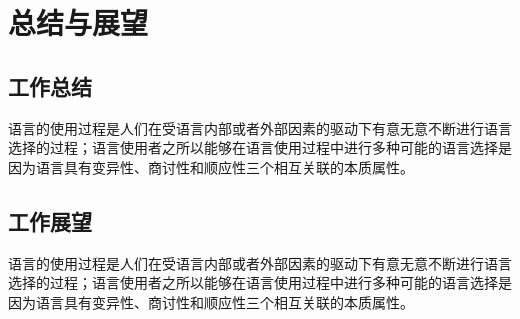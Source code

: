 \documentclass{standalone}
\begin{document}
\chapter{总结与展望}
\label{chap6}
\section{工作总结}

语言的使用过程是人们在受语言内部或者外部因素的驱动下有意无意不断进行语言选择的过程；语言使用者之所以能够在语言使用过程中进行多种可能的语言选择是因为语言具有变异性、商讨性和顺应性三个相互关联的本质属性。


\section{工作展望}

语言的使用过程是人们在受语言内部或者外部因素的驱动下有意无意不断进行语言选择的过程；语言使用者之所以能够在语言使用过程中进行多种可能的语言选择是因为语言具有变异性、商讨性和顺应性三个相互关联的本质属性。


\checkoddpage
  \ifoddpage
      \blankpage
    \else
      \newpage
  \fi
\end{document}

